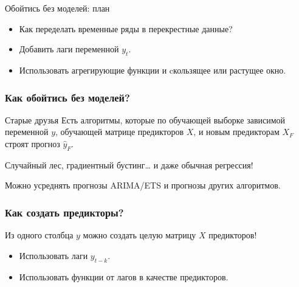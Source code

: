 
\begin{frame} %


\end{frame}



\begin{frame}{Обойтись без моделей: план}
  \begin{itemize}[<+->]
    \item Как переделать временные ряды в \alert{перекрестные} данные? 
    \item Добавить \alert{лаги} переменной $y_t$.
    \item Использовать \alert{агрегирующие функции} и \alert{cкользящее} или \alert{растущее} окно. 
  \end{itemize}

\end{frame}


\begin{frame}
  \frametitle{Как обойтись без моделей?}

  \begin{block}{Старые друзья}
    Есть алгоритмы, которые по обучающей выборке зависимой переменной $y$, 
    обучающей матрице предикторов $X$, и новым предикторам $X_F$ строят прогноз $\hat y_F$.      
  \end{block}

  \pause

  \alert{Случайный лес}, \alert{градиентный бустинг}\ldots{ }\pause и даже \alert{обычная регрессия}!

  \pause 

  Можно \alert{усреднять} прогнозы ARIMA/ETS и прогнозы других алгоритмов.

\end{frame}


\begin{frame}
  \frametitle{Как создать предикторы?}

  Из одного столбца $y$ можно создать целую матрицу $X$ предикторов!

  \begin{itemize}[<+->]
    \item Использовать \alert{лаги} $y_{t-k}$. 
    \item Использовать \alert{функции от лагов} в качестве предикторов. 
  \end{itemize}


\end{frame}

